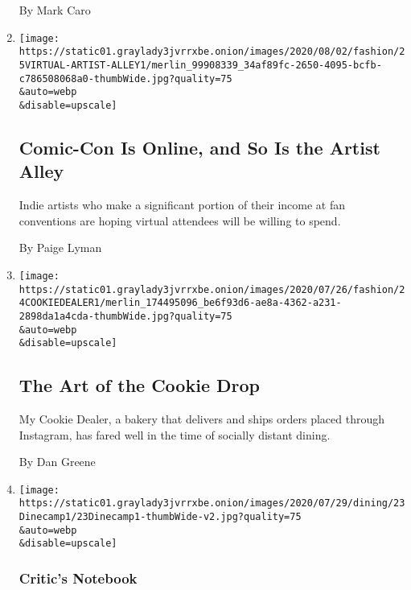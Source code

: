 \begin{enumerate}
  By Mark Caro
\item
  \href{/2020/07/25/style/comic-con-online-artist-alley.html}{}

  \texttt{[image: https://static01.graylady3jvrrxbe.onion/images/2020/08/02/fashion/25VIRTUAL-ARTIST-ALLEY1/merlin\_99908339\_34af89fc-2650-4095-bcfb-c786508068a0-thumbWide.jpg?quality=75\\\&auto=webp\\\&disable=upscale]}

  \hypertarget{comic-con-is-online-and-so-is-the-artist-alley}{%
  \subsection{Comic-Con Is Online, and So Is the Artist
  Alley}\label{comic-con-is-online-and-so-is-the-artist-alley}}

  Indie artists who make a significant portion of their income at fan
  conventions are hoping virtual attendees will be willing to spend.

  By Paige Lyman
\item
  \href{/2020/07/24/style/my-cookie-dealer-instagram.html}{}

  \texttt{[image: https://static01.graylady3jvrrxbe.onion/images/2020/07/26/fashion/24COOKIEDEALER1/merlin\_174495096\_be6f93d6-ae8a-4362-a231-2898da1a4cda-thumbWide.jpg?quality=75\\\&auto=webp\\\&disable=upscale]}

  \hypertarget{the-art-of-the-cookie-drop}{%
  \subsection{The Art of the Cookie
  Drop}\label{the-art-of-the-cookie-drop}}

  My Cookie Dealer, a bakery that delivers and ships orders placed
  through Instagram, has fared well in the time of socially distant
  dining.

  By Dan Greene
\item
  \href{/2020/07/23/dining/outdoor-dining-olmsted-summer-camp.html}{}

  \texttt{[image: https://static01.graylady3jvrrxbe.onion/images/2020/07/29/dining/23Dinecamp1/23Dinecamp1-thumbWide-v2.jpg?quality=75\\\&auto=webp\\\&disable=upscale]}

  \hypertarget{critics-notebook-1}{%
  \subsubsection{Critic's Notebook}\label{critics-notebook-1}}

  \hypertarget{a-brooklyn-restaurants-answer-to-cabin-fever-summer-camp}{%
}
\end{enumerate}
